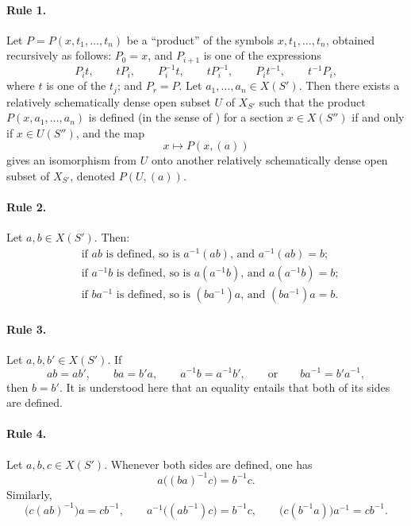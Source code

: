 \paragraph{Rule 1.}
Let \(P=P(x,t_1,\ldots,t_n)\) be a ``product'' of the symbols
\(x,t_1,\ldots,t_n\), obtained recursively as follows:
\(P_0=x\), and \(P_{i+1}\) is one of the expressions
\[
  P_i t,\qquad tP_i,\qquad P_i^{-1}t,\qquad
  tP_i^{-1},\qquad P_i t^{-1},\qquad t^{-1}P_i,
\]
where \(t\) is one of the \(t_j\); and \(P_r=P\). Let
\(a_1,\ldots,a_n\in X(S')\). Then there exists a relatively
schematically dense open subset \(U\) of \(X_{S'}\) such that the
product \(P(x,a_1,\ldots,a_n)\) is defined (in the sense of
) for a section \(x\in X(S'')\) if and only if
\(x\in U(S'')\), and the map
\[
  x\longmapsto P(x,(a))
\]
gives an isomorphism from \(U\) onto another relatively
schematically dense open subset of \(X_{S'}\), denoted
\(P(U,(a))\).

\paragraph{Rule 2.}
Let \(a,b\in X(S')\). Then:
\begin{align*}
  &\text{if \(ab\) is defined, so is \(a^{-1}(ab)\), and }
    a^{-1}(ab)=b;\\
  &\text{if \(a^{-1}b\) is defined, so is \(a(a^{-1}b)\), and }
    a(a^{-1}b)=b;\\
  &\text{if \(ba^{-1}\) is defined, so is \((ba^{-1})a\), and }
    (ba^{-1})a=b.
\end{align*}

\paragraph{Rule 3.}
Let \(a,b,b'\in X(S')\). If
\[
  ab=ab',\qquad ba=b'a,\qquad a^{-1}b=a^{-1}b',
  \qquad\text{or}\qquad ba^{-1}=b'a^{-1},
\]
then \(b=b'\). It is understood here that an equality entails that
both of its sides are defined.

\paragraph{Rule 4.}
Let \(a,b,c\in X(S')\). Whenever both sides are defined, one has
\[
  a\bigl((ba)^{-1}c\bigr)=b^{-1}c.
\]
Similarly,
\[
  \bigl(c(ab)^{-1}\bigr)a=cb^{-1},\qquad
  a^{-1}\bigl((ab^{-1})c\bigr)=b^{-1}c,\qquad
  \bigl(c(b^{-1}a)\bigr)a^{-1}=cb^{-1}.
\]

